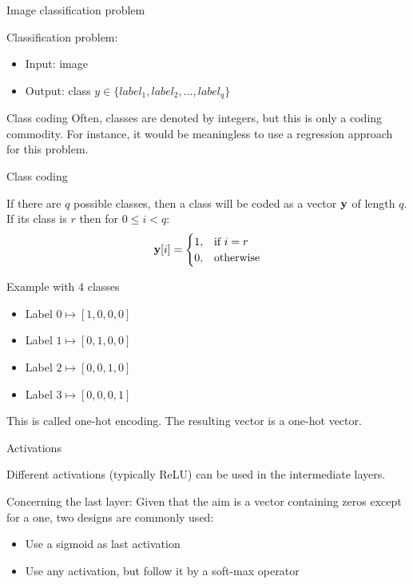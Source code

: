 \documentclass[xcolor=pdftex,dvipsnames,table,mathserif]{beamer}
\begin{document}
\begin{frame}{Image classification problem}

  Classification problem:
  \begin{itemize}
  \item Input: image
  \item Output: class $y \in \{ label_1, label_2, \ldots, label_q\}$
  \end{itemize}

  \begin{block}{Class coding}
    Often, classes are denoted by integers, but this is only a coding commodity. For instance, it would be meaningless to use a regression approach for this problem.
  \end{block}

\end{frame}

\begin{frame}{Class coding}

  If there are $q$ possible classes, then a class will be coded as a vector $\mathbf{y}$ of length $q$. If its class is $r$  then for $0 \leq i < q$:
  \[
  \mathbf{y}[i] =
  \begin{cases}
    1, & \text{if}\ i=r \\
    0, & \text{otherwise}
  \end{cases}
  \]

  \begin{block}{Example with $4$ classes}
    \begin{itemize}
    \item
      Label $0 \longmapsto [1,0,0,0]$
    \item
      Label $1 \longmapsto [0,1,0,0]$
    \item
      Label $2 \longmapsto [0,0,1,0]$
    \item
      Label $3 \longmapsto [0,0,0,1]$
    \end{itemize}
  \end{block}

This is called one-hot encoding. The resulting vector is a one-hot vector.

\end{frame}


\begin{frame}{Activations}

  Different activations (typically ReLU) can be used in the intermediate layers.
  \vspace{1em}

  Concerning the last layer: Given that the aim is a vector containing zeros except for a one, two designs are commonly used:

  \begin{itemize}
  \item Use a sigmoid as last activation
  \item Use any activation, but follow it by a soft-max operator
  \end{itemize}

\end{frame}
\end{document}
